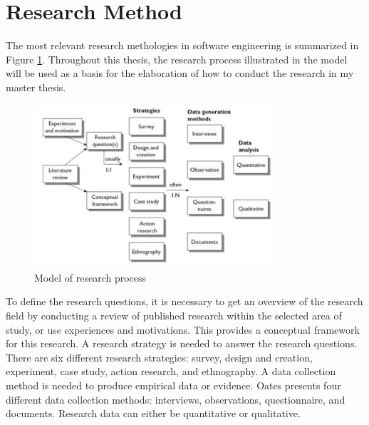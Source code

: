 \section{Research Method}
The most relevant research methologies in software engineering is summarized in Figure \ref{fig:researchProcess}. Throughout this thesis, the research process illustrated in the model will be used as a basis for the elaboration of how to conduct the research in my master thesis. 

\begin{figure}[H]
	\centering
	\includegraphics[width=0.8\textwidth]{images/researchStrategies.png}
	\caption{Model of research process\cite{Oates:2006:RIS:1202299}}
	\label{fig:researchProcess}
\end{figure}

To define the research questions, it is necessary to get an overview of the research field by conducting a review of published research within the selected area of study, or use experiences and motivations. This provides a conceptual framework for this research. A research strategy is needed to answer the research questions. There are six different research strategies: survey, design and creation, experiment, case study, action research, and ethnography. A data collection method is needed to produce empirical data or evidence. Oates presents four different data collection methods\cite{Oates:2006:RIS:1202299}: interviews, observations, questionnaire, and documents. Research data can either be quantitative or qualitative. 



